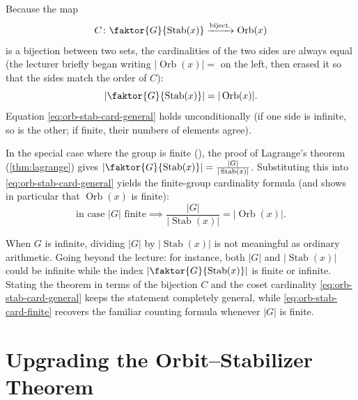 \begin{content}
Because the map
\[
C \colon \faktor{G}{\operatorname{Stab}(x)} \xrightarrow{\text{biject.}} \operatorname{Orb}(x)
\]
is a bijection between two sets, the cardinalities of the two sides are always equal (the lecturer briefly began writing $|\operatorname{Orb}(x)| =$ on the left, then erased it so that the sides match the order of $C$):
\begin{equation}\label{eq:orb-stab-card-general}
\left| \faktor{G}{\operatorname{Stab}(x)} \right| = |\operatorname{Orb}(x)|.
\end{equation}
Equation \eqref{eq:orb-stab-card-general} holds unconditionally (if one side is infinite, so is the other; if finite, their numbers of elements agree).

In the special case where the group is finite (), the proof of Lagrange's theorem (\cref{thm:lagrange}) gives $\left|\faktor{G}{\operatorname{Stab}(x)}\right| = \frac{|G|}{|\operatorname{Stab}(x)|}$. Substituting this into \eqref{eq:orb-stab-card-general} yields the finite-group cardinality formula (and shows in particular that $\operatorname{Orb}(x)$ is finite):
\begin{equation}\label{eq:orb-stab-card-finite}
\text{in case } |G| \text{ finite} \implies \frac{|G|}{|\operatorname{Stab}(x)|} = |\operatorname{Orb}(x)|.
\end{equation}

\begin{steps}
When $G$ is infinite, dividing $|G|$ by $|\operatorname{Stab}(x)|$ is not meaningful as ordinary arithmetic. Going beyond the lecture: for instance, both $|G|$ and $|\operatorname{Stab}(x)|$ could be infinite while the index $\left|\faktor{G}{\operatorname{Stab}(x)}\right|$ is finite or infinite. Stating the theorem in terms of the bijection $C$ and the coset cardinality \eqref{eq:orb-stab-card-general} keeps the statement completely general, while \eqref{eq:orb-stab-card-finite} recovers the familiar counting formula whenever $|G|$ is finite.
\end{steps}
\end{content}

\section{Upgrading the Orbit--Stabilizer Theorem}

